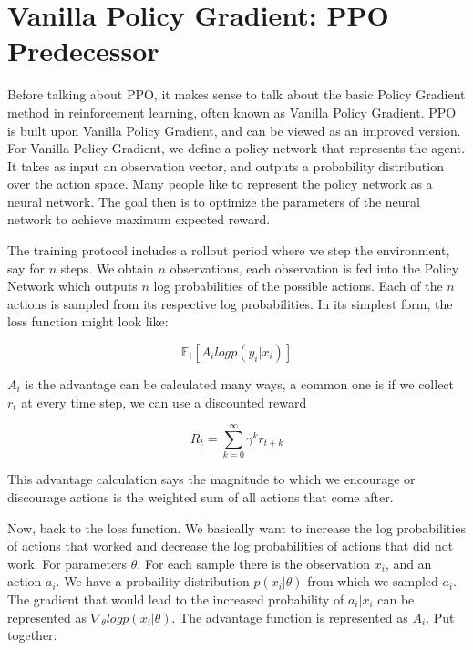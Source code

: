 \documentclass[conference]{IEEEtran}
\begin{document}
\section{Vanilla Policy Gradient: PPO Predecessor}

Before talking about PPO, it makes sense to talk about the basic Policy Gradient method in reinforcement learning, 
often known as Vanilla Policy Gradient. PPO is built upon Vanilla Policy Gradient, and can be viewed as an improved version. 
For Vanilla Policy Gradient, we define a policy network that represents the agent. It takes as input an observation vector, and 
outputs a probability distribution over the action space. Many people like to represent the policy network as a neural network. 
The goal then is to optimize the parameters of the neural network to achieve maximum expected reward. \par
The training protocol includes a rollout period where we step the environment, say for $n$ steps. We obtain $n$ observations, each observation is fed into
the Policy Network which outputs $n$ log probabilities of the possible actions. Each of the $n$ actions is sampled from its respective log probabilities.
In its simplest form, the loss function might look like:

\begin{equation}
    \mathbb{E}_{i}[A_i logp(y_i \vert x_i)]
\end{equation}

$A_i$ is the advantage can be calculated many ways, a common one is if we collect $r_t$ at every time step, we can use a discounted reward

\begin{equation}
    R_t = \sum_{k=0}^{\infty} \gamma^k r_{t+k}
\end{equation}

This advantage calculation says the magnitude to which we encourage or discourage actions is the weighted sum of all actions that come after. \par
Now, back to the loss function. We basically want to increase the log probabilities of actions that worked and decrease the log probabilities of actions
that did not work. For parameters $\theta$. For each sample there is the observation $x_i$, and an action $a_i$. We have a probaility distribution $p(x_i \vert \theta)$ from which 
we sampled $a_i$. The gradient that would lead to the increased probability of $a_i \vert x_i$ can be represented as $\nabla_\theta log p(x_i \vert \theta)$.
The advantage function is represented as $A_i$. Put together:
\end{document}
